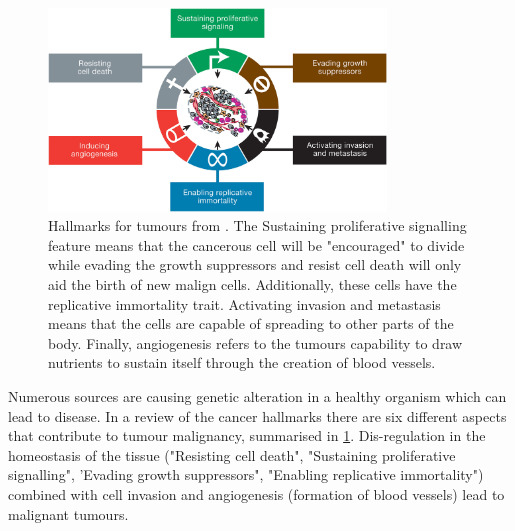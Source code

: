 \begin{figure}[!htb]
  \centering\includegraphics[width=0.8\textwidth,height=0.8\textheight,keepaspectratio]{Sections/Lit_review/Resources/tumour_causes.jpeg}
    \caption{Hallmarks for tumours from \citep{Hanahan2011-px}. The Sustaining proliferative signalling feature means that the cancerous cell will be "encouraged" to divide while evading the growth suppressors and resist cell death will only aid the birth of new malign cells. Additionally, these cells have the replicative immortality trait. Activating invasion and metastasis means that the cells are capable of spreading to other parts of the body. Finally, angiogenesis refers to the tumours capability to draw nutrients to sustain itself through the creation of blood vessels. }
    \label{fig:hallmarks_cancer}
\end{figure}


Numerous sources are causing genetic alteration in a healthy organism which can lead to disease. In a review of the cancer hallmarks \citep{Hanahan2011-px} there are six different aspects that contribute to tumour malignancy, summarised in \cref{fig:hallmarks_cancer}.  Dis-regulation in the homeostasis of the tissue ("Resisting cell death",  "Sustaining proliferative signalling", 'Evading growth suppressors", "Enabling replicative immortality") combined with cell invasion and angiogenesis (formation of blood vessels) lead to malignant tumours. 

